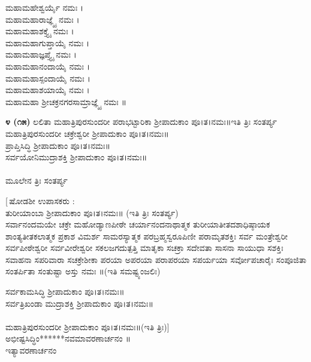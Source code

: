 
 ಮಹಾಮಹೇಶ್ವರ್ಯೈ ನಮಃ ।\\
 ಮಹಾಮಹಾರಾಜ್ಞ್ಯೈ ನಮಃ ।\\
 ಮಹಾಮಹಾಶಕ್ತ್ಯೈ ನಮಃ ।\\
 ಮಹಾಮಹಾಗುಪ್ತಾಯೈ ನಮಃ ।\\
 ಮಹಾಮಹಾಜ್ಞಪ್ತ್ಯೈ ನಮಃ ।\\
 ಮಹಾಮಹಾನಂದಾಯೈ ನಮಃ ।\\
 ಮಹಾಮಹಾಸ್ಪಂದಾಯೈ ನಮಃ ।\\
 ಮಹಾಮಹಾಶಯಾಯೈ ನಮಃ ।\\
 ಮಹಾಮಹಾ ಶ್ರೀಚಕ್ರನಗರಸಾಮ್ರಾಜ್ಞ್ಯೈ ನಮಃ ॥

{\bfseries ೪ (೧೫)} ಲಲಿತಾ ಮಹಾತ್ರಿಪುರಸುಂದರೀ ಪರಾಭಟ್ಟಾರಿಕಾ ಶ್ರೀಪಾದುಕಾಂ ಪೂ।ತ।ನಮಃ॥ಇತಿ ತ್ರಿಃ ಸಂತರ್ಪ್ಯ\\
ಮಹಾತ್ರಿಪುರಸುಂದರೀ ಚಕ್ರೇಶ್ವರೀ ಶ್ರೀಪಾದುಕಾಂ ಪೂ।ತ।ನಮಃ॥\\
 ಪ್ರಾಪ್ತಿಸಿದ್ಧಿ ಶ್ರೀಪಾದುಕಾಂ ಪೂ।ತ।ನಮಃ॥\\
 ಸರ್ವಯೋನಿಮುದ್ರಾಶಕ್ತಿ ಶ್ರೀಪಾದುಕಾಂ ಪೂ।ತ।ನಮಃ॥\\
\\
ಮೂಲೇನ ತ್ರಿಃ ಸಂತರ್ಪ್ಯ

 [\,ಷೋಡಶೀ ಉಪಾಸಕರು :\\ 
 ತುರೀಯಾಂಬಾ ಶ್ರೀಪಾದುಕಾಂ ಪೂ।ತ।ನಮಃ॥ (ಇತಿ ತ್ರಿಃ ಸಂತರ್ಪ್ಯ)\\
 ಸರ್ವಾನಂದಮಯೇ ಚಕ್ರೇ ಮಹೋಡ್ಯಾಣಪೀಠೇ ಚರ್ಯಾನಂದನಾಥಾತ್ಮಕ ತುರೀಯಾತೀತದಶಾಧಿಷ್ಠಾಯಕ ಶಾಂತ್ಯತೀತಕಲಾತ್ಮಕ ಪ್ರಕಾಶ ವಿಮರ್ಶ ಸಾಮರಸ್ಯಾತ್ಮಕ ಪರಬ್ರಹ್ಮಸ್ವರೂಪಿಣೀ ಪರಾಮೃತಶಕ್ತಿಃ ಸರ್ವ ಮಂತ್ರೇಶ್ವರೀ ಸರ್ವಪೀಠೇಶ್ವರೀ ಸರ್ವವೀರೇಶ್ವರೀ ಸಕಲಜಗದುತ್ಪತ್ತಿ ಮಾತೃಕಾ ಸಚಕ್ರಾ ಸದೇವತಾ ಸಾಸನಾ ಸಾಯುಧಾ ಸಶಕ್ತಿಃ ಸವಾಹನಾ ಸಪರಿವಾರಾ ಸಚಕ್ರೇಶೀಕಾ ಪರಯಾ ಅಪರಯಾ ಪರಾಪರಯಾ ಸಪರ್ಯಯಾ ಸರ್ವೋಪಚಾರೈಃ ಸಂಪೂಜಿತಾ ಸಂತರ್ಪಿತಾ ಸಂತುಷ್ಟಾ ಅಸ್ತು ನಮಃ ॥(ಇತಿ ಸಮಷ್ಟ್ಯಂಜಲಿಃ)

 ಸರ್ವಕಾಮಸಿದ್ಧಿ ಶ್ರೀಪಾದುಕಾಂ ಪೂ।ತ।ನಮಃ॥\\
 ಸರ್ವತ್ರಿಖಂಡಾ ಮುದ್ರಾಶಕ್ತಿ ಶ್ರೀಪಾದುಕಾಂ ಪೂ।ತ।ನಮಃ॥\\
\\
 ಮಹಾತ್ರಿಪುರಸುಂದರೀ ಶ್ರೀಪಾದುಕಾಂ ಪೂ।ತ।ನಮಃ॥(ಇತಿ ತ್ರಿಃ)]\,\\
 ಅಭೀಷ್ಟಸಿದ್ಧಿಂ******ನವಮಾವರಣಾರ್ಚನಂ ॥\\
ಇತ್ಯಾವರಣಾರ್ಚನಂ
